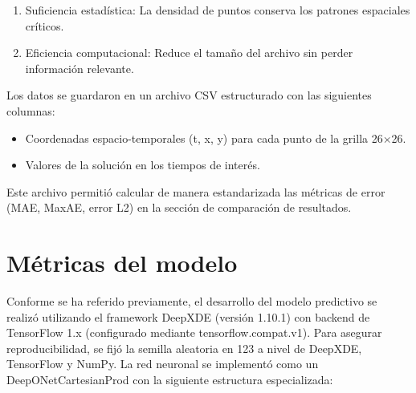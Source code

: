 \documentclass[
  spanish,
  us-letterpaper,
  DIV=11,
  numbers=noendperiod]{scrreprt}
\providecommand{\tightlist}{%
  \setlength{\itemsep}{0pt}\setlength{\parskip}{0pt}}
\theoremstyle{definition}
\theoremstyle{plain}
\theoremstyle{remark}
\begin{document}
\begin{enumerate}
\def\labelenumi{\arabic{enumi}.}
\tightlist
\item
  Suficiencia estadística: La densidad de puntos conserva los patrones
  espaciales críticos.
\item
  Eficiencia computacional: Reduce el tamaño del archivo sin perder
  información relevante.
\end{enumerate}

Los datos se guardaron en un archivo CSV estructurado con las siguientes
columnas:

\begin{itemize}
\tightlist
\item
  Coordenadas espacio-temporales (t, x, y) para cada punto de la grilla
  26×26.
\item
  Valores de la solución en los tiempos de interés.
\end{itemize}

Este archivo permitió calcular de manera estandarizada las métricas de
error (MAE, MaxAE, error L2) en la sección de comparación de resultados.

\chapter{Métricas del modelo}\label{muxe9tricas-del-modelo}

Conforme se ha referido previamente, el desarrollo del modelo predictivo
se realizó utilizando el framework DeepXDE (versión 1.10.1) con backend
de TensorFlow 1.x (configurado mediante tensorflow.compat.v1). Para
asegurar reproducibilidad, se fijó la semilla aleatoria en 123 a nivel
de DeepXDE, TensorFlow y NumPy. La red neuronal se implementó como un
DeepONetCartesianProd con la siguiente estructura especializada:
\end{document}
